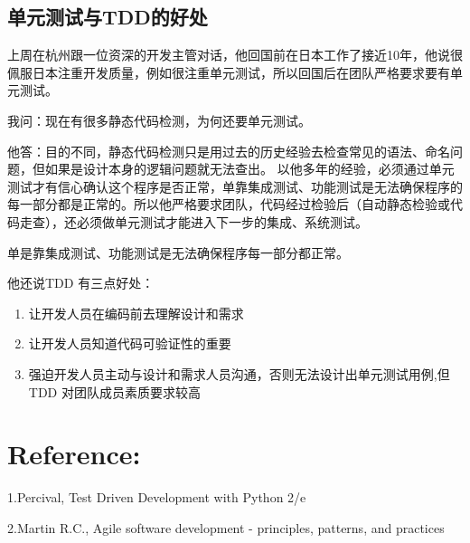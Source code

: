 \hypertarget{ux5355ux5143ux6d4bux8bd5ux4e0etddux7684ux597dux5904}{%
\subsection{单元测试与TDD的好处}\label{ux5355ux5143ux6d4bux8bd5ux4e0etddux7684ux597dux5904}}

上周在杭州跟一位资深的开发主管对话，他回国前在日本工作了接近10年，他说很佩服日本注重开发质量，例如很注重单元测试，所以回国后在团队严格要求要有单元测试。

我问：现在有很多静态代码检测，为何还要单元测试。

他答：目的不同，静态代码检测只是用过去的历史经验去检查常见的语法、命名问题，但如果是设计本身的逻辑问题就无法查出。
以他多年的经验，必须通过单元测试才有信心确认这个程序是否正常，单靠集成测试、功能测试是无法确保程序的每一部分都是正常的。所以他严格要求团队，代码经过检验后（自动静态检验或代码走查），还必须做单元测试才能进入下一步的集成、系统测试。

单是靠集成测试、功能测试是无法确保程序每一部分都正常。

他还说TDD 有三点好处：

\begin{enumerate}
\tightlist
\item
  让开发人员在编码前去理解设计和需求
\item
  让开发人员知道代码可验证性的重要
\item
  强迫开发人员主动与设计和需求人员沟通，否则无法设计出单元测试用例,但TDD 对团队成员素质要求较高
\end{enumerate}




\hypertarget{ux9644ux4ef6}{%
\section{Reference:}\label{ux9644ux4ef6}}

1.Percival, Test Driven Development with Python 2/e

2.Martin R.C., Agile software development - principles, patterns, and
practices





